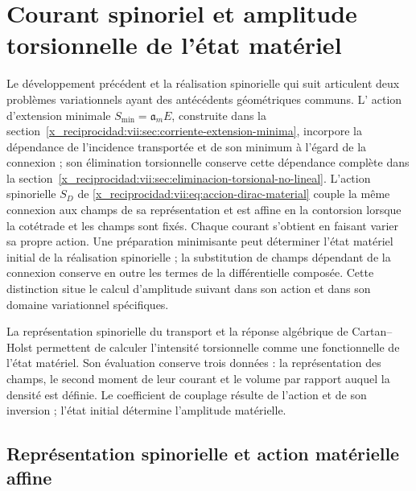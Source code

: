 \chapter{Courant spinoriel et amplitude torsionnelle de l'état matériel}
\label{x_reciprocidad:vii:sec:corriente-espinorial-densidad}

Le développement précédent et la réalisation spinorielle qui suit articulent
deux problèmes variationnels ayant des antécédents géométriques communs. L'
action d'extension minimale \(S_{\min}=\mathfrak a_m E\), construite dans
la section~\ref{x_reciprocidad:vii:sec:corriente-extension-minima}, incorpore la
dépendance de l'incidence transportée et de son minimum à l'égard de la
connexion ; son élimination torsionnelle conserve cette dépendance complète dans
la section~\ref{x_reciprocidad:vii:sec:eliminacion-torsional-no-lineal}. L'action
spinorielle \(S_D\) de \eqref{x_reciprocidad:vii:eq:accion-dirac-material} couple la
même connexion aux champs de sa représentation et est affine en la
contorsion lorsque la cotétrade et les champs sont fixés. Chaque courant s'obtient
en faisant varier sa propre action. Une préparation minimisante peut déterminer
l'état matériel initial de la réalisation spinorielle ; la substitution
de champs dépendant de la connexion conserve en outre les termes
de la différentielle composée. Cette distinction situe le calcul d'amplitude
suivant dans son action et dans son domaine variationnel spécifiques.

La représentation spinorielle du transport et la réponse algébrique de Cartan--Holst permettent de calculer l'intensité torsionnelle comme une fonctionnelle de l'état matériel. Son évaluation conserve trois données : la représentation des champs, le second moment de leur courant et le volume par rapport auquel la densité est définie. Le coefficient de couplage résulte de l'action et de son inversion ; l'état initial détermine l'amplitude matérielle.

\section{Représentation spinorielle et action matérielle affine}
\label{x_reciprocidad:vii:subsec:accion-espinorial-afin}

